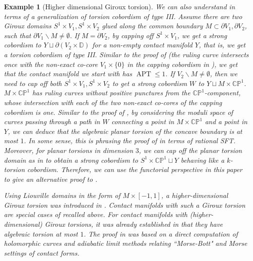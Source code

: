 \documentclass[11pt]{amsart}
\numberwithin{equation}{section}
\newtheorem{example}[theorem]{\textbf{Example}}
\def\D{{\mathbb D}}
\newcommand{\CP}{\mathbb{C}\mathbb{P}}
\DeclareMathOperator{\APT}{APT}
\begin{document}
\begin{example}[Higher dimensional Giroux torsion]
We can also understand \cite[Theorem B]{MNW} in terms of a generalization of torsion cobordism of type III. Assume there are two Giroux domains $S^1\times V_1,S^1\times V_2$ glued along the common boundary $M\subset \partial V_1,\partial V_2$, such that $\partial V_1\backslash M \ne \emptyset$. If $M=\partial V_2$, by capping off $S^1\times V_1$, we get a strong cobordism to $Y\sqcup \partial(V_2\times \D)$ for a non-empty contact manifold $Y$, that is, we get a torsion cobordism of type III. Similar to the proof of  (the ruling curve intersects once with the non-exact co-core $V_1\times \{0\}$ in the capping cobordism in ), we get that the contact manifold we start with has $\APT\le 1$. If $V_2\backslash M\ne \emptyset$, then we need to cap off both $S^1\times V_1,S^1\times V_2$ to get a strong cobordism $W$ to $Y\sqcup M\times \CP^1$.  $M\times \CP^1$ has ruling curves without positive punctures from the $\CP^1$-component, whose intersection with each of the two non-exact co-cores of the capping cobordism is one. Similar to the proof of , by considering the moduli space of curves passing through a path in $W$ connecting a point in $M\times \CP^1$ and a point in $Y$, we can deduce that the algebraic planar torsion of the concave boundary is at most $1$. In some sense, this is phrasing the proof of \cite[Theorem 6.1]{MNW} in terms of rational SFT. Moreover, for planar torsions in dimension $3$, we can cap off the planar torsion domain as in \cite{Wen13} to obtain a strong cobordism to $S^1\times \CP^1\sqcup Y$ behaving like a $k$-torsion cobordism. Therefore, we can use the functorial perspective in this paper to give an alternative proof to \cite[Theorem 6]{LW}.

Using Liouville domains in the form of  $M\times [-1,1]$, a higher-dimensional Giroux torsion was introduced in \cite[before Corollary 8.2]{MNW}. Contact manifolds with such a Giroux torsion are special cases of \cite[Theorem B]{MNW} recalled above. For contact manifolds with (higher-dimensional) Giroux torsions, it was already established in \cite[Theorem 1.6]{moreno2019algebraic} that they have algebraic torsion at most $1$. The proof in \cite{moreno2019algebraic} was based on a direct computation of holomorphic curves and adiabatic limit methods relating ``Morse-Bott" and Morse settings of contact forms. 
\end{example}
\end{document}
